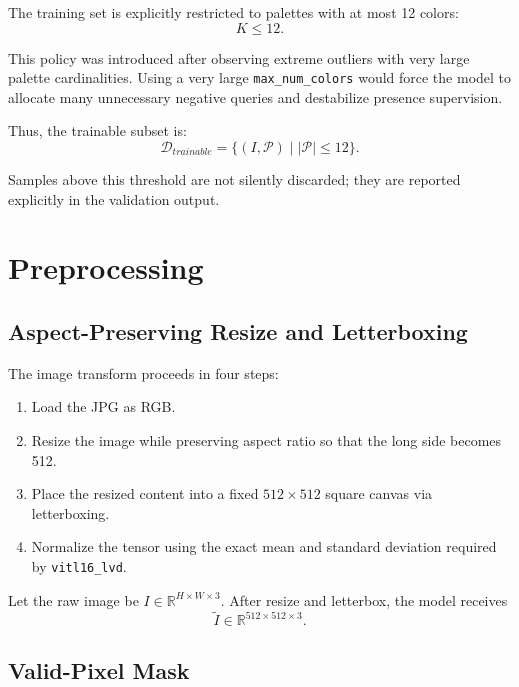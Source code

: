 \documentclass[11pt,a4paper]{article}
\begin{document}
The training set is explicitly restricted to palettes with at most 12 colors:
\begin{equation}
K \leq 12.
\end{equation}

This policy was introduced after observing extreme outliers with very large palette cardinalities. Using a very large
\texttt{max\_num\_colors} would force the model to allocate many unnecessary negative queries and destabilize presence supervision.

Thus, the trainable subset is:
\begin{equation}
\mathcal{D}_{trainable} = \{(I, \mathcal{P}) \mid |\mathcal{P}| \leq 12\}.
\end{equation}

Samples above this threshold are not silently discarded; they are reported explicitly in the validation output.

\section{Preprocessing}

\subsection{Aspect-Preserving Resize and Letterboxing}

The image transform proceeds in four steps:
\begin{enumerate}[leftmargin=2em]
    \item Load the JPG as RGB.
    \item Resize the image while preserving aspect ratio so that the long side becomes 512.
    \item Place the resized content into a fixed $512 \times 512$ square canvas via letterboxing.
    \item Normalize the tensor using the exact mean and standard deviation required by \texttt{vitl16\_lvd}.
\end{enumerate}

Let the raw image be $I \in \mathbb{R}^{H \times W \times 3}$. After resize and letterbox, the model receives
\begin{equation}
\tilde{I} \in \mathbb{R}^{512 \times 512 \times 3}.
\end{equation}

\subsection{Valid-Pixel Mask}
\end{document}
